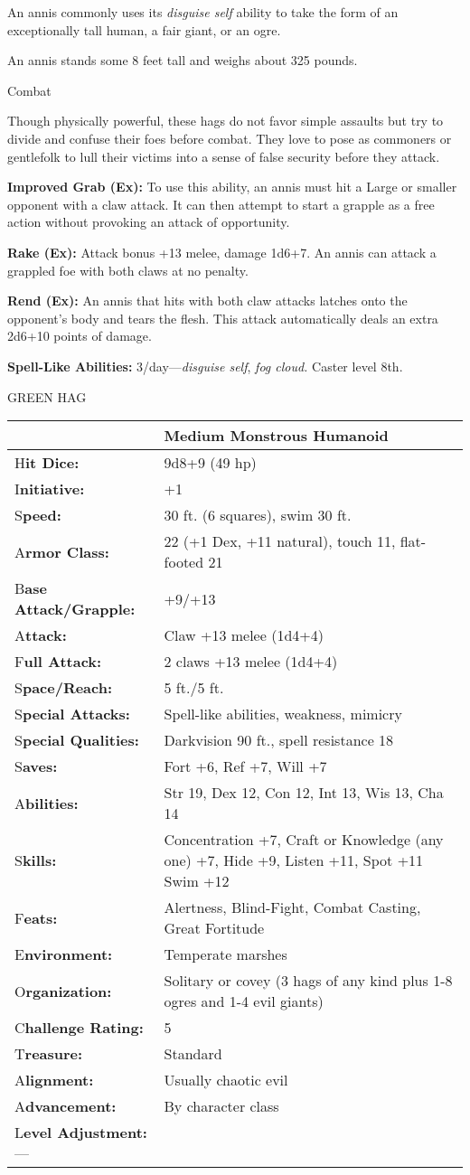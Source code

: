 \documentclass{article}
\begin{document}
An annis commonly uses its \textit{disguise self }ability to take the form of an 
exceptionally tall human, a fair giant, or an ogre.

An annis stands some 8 feet tall and weighs about 325 pounds.

Combat

Though physically powerful, these hags do not favor simple assaults but try to 
divide and confuse their foes before combat. They love to pose as commoners or 
gentlefolk to lull their victims into a sense of false security before they attack.

\textbf{Improved Grab (Ex):} To use this ability, an annis must hit a Large or 
smaller opponent with a claw attack. It can then attempt to start a grapple as 
a free action without provoking an attack of opportunity.

\textbf{Rake (Ex):} Attack bonus +13 melee, damage 1d6+7. An annis can attack a 
grappled foe with both claws at no penalty.

\textbf{Rend (Ex): }An annis that hits with both claw attacks latches onto the 
opponent's body and tears the flesh. This attack automatically deals an extra 2d6+10 
points of damage.

\textbf{Spell-Like Abilities:} 3/day---\textit{disguise self}, \textit{fog cloud. 
}Caster level 8th.

\vspace{12pt}
GREEN HAG

\begin{tabular}{|>{\raggedright}p{91pt}|>{\raggedright}p{204pt}|}
\hline
  & Medium Monstrous Humanoid\tabularnewline
\hline
H\textbf{it Dice:} & 9d8+9 (49 hp)\tabularnewline
\hline
I\textbf{nitiative:} & +1\tabularnewline
\hline
S\textbf{peed:} & 30 ft. (6 squares), swim 30 ft.\tabularnewline
\hline
A\textbf{rmor Class:} & 22 (+1 Dex, +11 natural), touch 11, flat-footed 21\tabularnewline
\hline
B\textbf{ase Attack/Grapple:} & +9/+13\tabularnewline
\hline
A\textbf{ttack:} & Claw +13 melee (1d4+4)\tabularnewline
\hline
F\textbf{ull Attack:} & 2 claws +13 melee (1d4+4)\tabularnewline
\hline
S\textbf{pace/Reach:} & 5 ft./5 ft.\tabularnewline
\hline
S\textbf{pecial Attacks:} & Spell-like abilities, weakness, mimicry\tabularnewline
\hline
S\textbf{pecial Qualities:} & Darkvision 90 ft., spell resistance 18\tabularnewline
\hline
S\textbf{aves:} & Fort +6, Ref +7, Will +7\tabularnewline
\hline
A\textbf{bilities:} & Str 19, Dex 12, Con 12, Int 13, Wis 13, Cha 14\tabularnewline
\hline
S\textbf{kills:} & Concentration +7, Craft or Knowledge (any one) +7, Hide +9, 
Listen +11, Spot +11 Swim +12\tabularnewline
\hline
F\textbf{eats:} & Alertness, Blind-Fight, Combat Casting, Great Fortitude\tabularnewline
\hline
E\textbf{nvironment:} & Temperate marshes\tabularnewline
\hline
O\textbf{rganization:} & Solitary or covey (3 hags of any kind plus 1-8 ogres and 
1-4 evil giants) \tabularnewline
\hline
C\textbf{hallenge Rating:} & 5\tabularnewline
\hline
T\textbf{reasure:} & Standard\tabularnewline
\hline
A\textbf{lignment:} & Usually chaotic evil\tabularnewline
\hline
A\textbf{dvancement:} & By character class\tabularnewline
\hline
L\textbf{evel Adjustment:}--- & \tabularnewline
\hline
\end{tabular}
\end{document}
